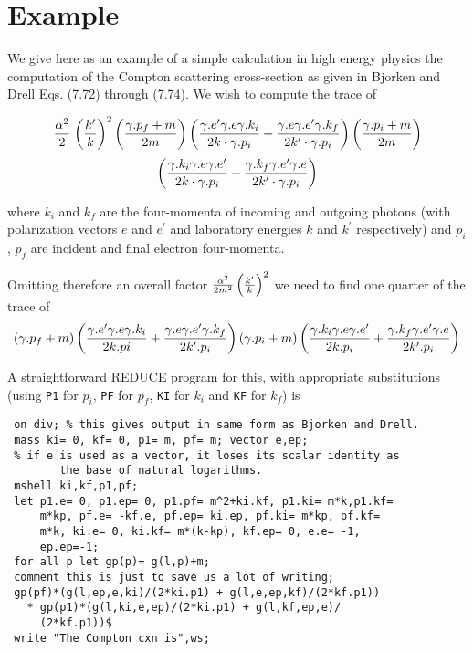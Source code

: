 \section{Example}

We give here as an example of a simple calculation in high energy physics
the computation of the Compton scattering cross-section as given in
Bjorken and Drell Eqs. (7.72) through (7.74). We wish to compute the trace of

$$\left. \alpha^2\over2 \right. \left({k^\prime\over k}\right)^2
 \left({\gamma.p_f+m\over2m}\right)\left({\gamma.e^\prime \gamma.e
 \gamma.k_i\over2k\cdot \gamma.p_i} + {\gamma.e\gamma.e^\prime
 \gamma.k_f\over2k^\prime\cdot \gamma.p_i}\right)
 \left({\gamma.p_i+m\over2m}\right)$$
$$
 \left({\gamma.k_i\gamma.e\gamma.e^\prime\over2k\cdot \gamma.p_i} +
 {\gamma.k_f\gamma.e^\prime\gamma.e\over2k^\prime\cdot \gamma.p_i}
 \right)
$$

where $k_i$ and $k_f$ are the four-momenta of incoming and outgoing photons
(with polarization vectors $e$ and $e^\prime$ and laboratory energies 
$k$ and $k^\prime$
respectively) and $p_i$, $p_f$ are incident and final electron four-momenta.

Omitting therefore an overall factor
${\alpha^2\over2m^2}\left({k^\prime\over k}\right)^2$ we need to find
one quarter of the trace of
$${
 \left( \gamma.p_f + m\right)
 \left({\gamma.e^\prime \gamma.e\gamma.k_i\over2k.pi} +
  {\gamma.e\gamma.e^\prime \gamma.k_f\over 2k^\prime .p_i}\right) \left(
  \gamma.p_i + m\right)
 \left({\gamma.k_i\gamma.e\gamma.e^\prime\over 2k.p_i} +
  {\gamma.k_f\gamma.e^\prime \gamma.e\over2k^\prime .p_i}\right) }$$

A straightforward REDUCE program for this, with appropriate substitutions
(using {\tt P1} for $p_i$, {\tt PF} for $p_f$, {\tt KI}
for $k_i$ and {\tt KF} for $k_f$) is
\begin{verbatim}
 on div; % this gives output in same form as Bjorken and Drell.
 mass ki= 0, kf= 0, p1= m, pf= m; vector e,ep;
 % if e is used as a vector, it loses its scalar identity as
        the base of natural logarithms.
 mshell ki,kf,p1,pf;
 let p1.e= 0, p1.ep= 0, p1.pf= m^2+ki.kf, p1.ki= m*k,p1.kf=
     m*kp, pf.e= -kf.e, pf.ep= ki.ep, pf.ki= m*kp, pf.kf=
     m*k, ki.e= 0, ki.kf= m*(k-kp), kf.ep= 0, e.e= -1,
     ep.ep=-1;
 for all p let gp(p)= g(l,p)+m;
 comment this is just to save us a lot of writing;
 gp(pf)*(g(l,ep,e,ki)/(2*ki.p1) + g(l,e,ep,kf)/(2*kf.p1))
   * gp(p1)*(g(l,ki,e,ep)/(2*ki.p1) + g(l,kf,ep,e)/
     (2*kf.p1))$
 write "The Compton cxn is",ws;
\end{verbatim}

